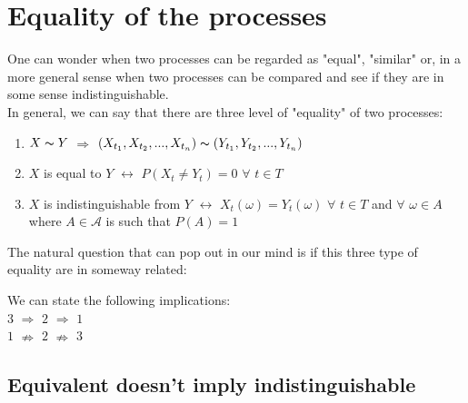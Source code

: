 \section{Equality of the processes}
One can wonder when two processes can be regarded as "equal", "similar" or, in a more general sense when two processes can be compared and see if they are in some sense indistinguishable.\\
In general, we can say that there are three level of "equality" of two processes:
\begin{enumerate}
    \item $X \thicksim Y$ $\Rightarrow$ $(X_{t_1}, X_{t_2}, ...,X_{t_n}) \thicksim (Y_{t_1}, Y_{t_2}, ...,Y_{t_n}) $
    \item $X$ is equal to $Y$ $\longleftrightarrow$ $P(X_t \neq Y_t) = 0$ $\forall$ $t \in T$
    \item $X$ is indistinguishable from $Y$ $\longleftrightarrow$ $X_t(\omega) = Y_t(\omega)$ $\forall$ $t \in T$ and $\forall$ $\omega \in A$ where $A \in \mathcal{A}$ is such that $P(A) = 1$  
\end{enumerate}
The natural question that can pop out in our mind is if this three type of equality are in someway related:
\begin{center}
    We can state the following implications:\\
    $3$ $\Rightarrow$ $2$ $\Rightarrow$ $1$ \\
    $1$ $\nRightarrow$ $2$ $\nRightarrow$ $3$ 
\end{center}
\subsection{Equivalent doesn't imply indistinguishable}

